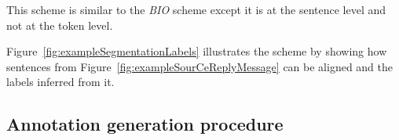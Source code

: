 








%
This scheme is similar to the \textit{BIO} %
scheme except it is at the sentence level and not at the token level.


Figure~\ref{fig:exampleSegmentationLabels} illustrates the scheme by showing how sentences from Figure~\ref{fig:exampleSourCeReplyMessage} can be aligned and the labels inferred from it. 




\subsection{Annotation generation procedure}
\label{}


